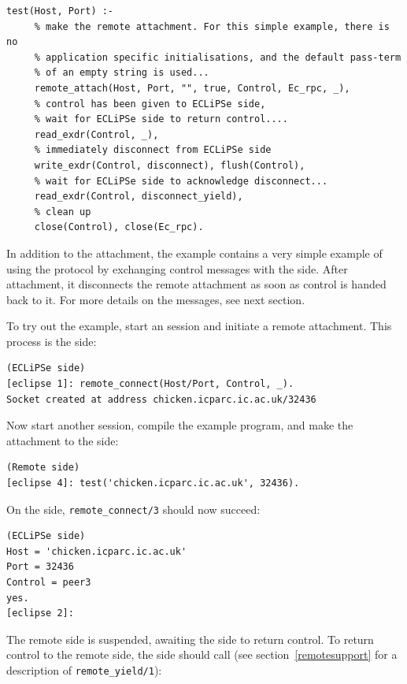 \begin{verbatim}
test(Host, Port) :-
     % make the remote attachment. For this simple example, there is no
     % application specific initialisations, and the default pass-term
     % of an empty string is used...
     remote_attach(Host, Port, "", true, Control, Ec_rpc, _),
     % control has been given to ECLiPSe side,
     % wait for ECLiPSe side to return control....
     read_exdr(Control, _),
     % immediately disconnect from ECLiPSe side
     write_exdr(Control, disconnect), flush(Control),
     % wait for ECLiPSe side to acknowledge disconnect...
     read_exdr(Control, disconnect_yield),
     % clean up
     close(Control), close(Ec_rpc).

\end{verbatim}

In addition to the attachment, the example contains a very simple example
of using the protocol by exchanging control messages with the {\eclipse}
side. After attachment, it disconnects the remote attachment as soon as
control is handed back to it. For more details on the messages, see next
section. 

To try out the example, start an {\eclipse} session and initiate a remote
attachment. This process is the {\eclipse} side:

\begin{verbatim}
(ECLiPSe side)
[eclipse 1]: remote_connect(Host/Port, Control, _).
Socket created at address chicken.icparc.ic.ac.uk/32436
\end{verbatim}

Now start another {\eclipse} session, compile the example program, and make
the attachment to the {\eclipse} side:

\begin{verbatim}
(Remote side)
[eclipse 4]: test('chicken.icparc.ic.ac.uk', 32436).
\end{verbatim}

On the {\eclipse} side, {\tt remote_connect/3} should now succeed:

\begin{verbatim}
(ECLiPSe side)
Host = 'chicken.icparc.ic.ac.uk'
Port = 32436
Control = peer3
yes.
[eclipse 2]: 
\end{verbatim}

The remote side is suspended, awaiting the {\eclipse} side to return
control. To return control to the remote side, the {\eclipse} side should
call  (see section~\ref{remotesupport} for a description
of {\tt remote_yield/1}):

